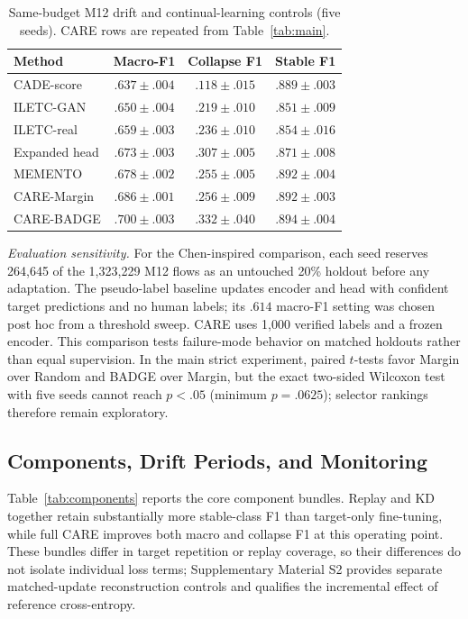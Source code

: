 \documentclass[journal]{IEEEtran}
\newcommand{\ours}{CARE}
\begin{document}
\begin{table}[!t]
\centering
\caption{Same-budget M12 drift and continual-learning controls (five seeds). CARE rows are repeated from Table~\ref{tab:main}.}
\label{tab:cl}
\scriptsize
\setlength{\tabcolsep}{3pt}
\begin{tabular}{@{}lccc@{}}
\toprule
Method & Macro-F1 & Collapse F1 & Stable F1\\
\midrule
CADE-score & $.637\!\pm\!.004$ & $.118\!\pm\!.015$ & $.889\!\pm\!.003$\\
ILETC-GAN & $.650\!\pm\!.004$ & $.219\!\pm\!.010$ & $.851\!\pm\!.009$\\
ILETC-real & $.659\!\pm\!.003$ & $.236\!\pm\!.010$ & $.854\!\pm\!.016$\\
Expanded head & $.673\!\pm\!.003$ & $.307\!\pm\!.005$ & $.871\!\pm\!.008$\\
MEMENTO & $.678\!\pm\!.002$ & $.255\!\pm\!.005$ & $.892\!\pm\!.004$\\
\ours{}-Margin & $.686\!\pm\!.001$ & $.256\!\pm\!.009$ & $.892\!\pm\!.003$\\
\ours{}-BADGE & $.700\!\pm\!.003$ & $.332\!\pm\!.040$ & $.894\!\pm\!.004$\\
\bottomrule
\end{tabular}
\end{table}

\noindent\emph{Evaluation sensitivity.}
For the Chen-inspired comparison, each seed reserves 264,645 of the 1,323,229 M12 flows as an untouched 20\% holdout before any adaptation. The pseudo-label baseline updates encoder and head with confident target predictions and no human labels; its $.614$ macro-F1 setting was chosen post hoc from a threshold sweep. \ours{} uses 1,000 verified labels and a frozen encoder. This comparison tests failure-mode behavior on matched holdouts rather than equal supervision. In the main strict experiment, paired $t$-tests favor Margin over Random and BADGE over Margin, but the exact two-sided Wilcoxon test with five seeds cannot reach $p<.05$ (minimum $p=.0625$); selector rankings therefore remain exploratory.

\subsection{Components, Drift Periods, and Monitoring}
Table~\ref{tab:components} reports the core component bundles. Replay and KD together retain substantially more stable-class F1 than target-only fine-tuning, while full \ours{} improves both macro and collapse F1 at this operating point. These bundles differ in target repetition or replay coverage, so their differences do not isolate individual loss terms; Supplementary Material S2 provides separate matched-update reconstruction controls and qualifies the incremental effect of reference cross-entropy.
\end{document}
